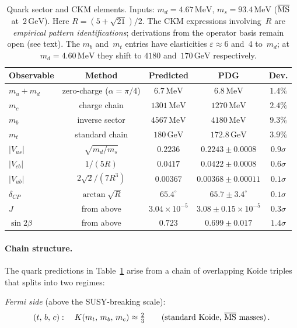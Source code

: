 \documentclass[12pt,a4paper]{article}
\newcommand{\MeV}{\,\mathrm{MeV}}
\newcommand{\GeV}{\,\mathrm{GeV}}
\begin{document}
\begin{table}[ht]
\centering
\begin{tabular}{lcccc}
\toprule
  Observable & Method & Predicted & PDG & Dev. \\
\midrule
$m_u + m_d$ & zero-charge ($\alpha{=}\pi/4$) & $6.7\MeV$ & $6.8\MeV$ & $1.4\%$ \\
$m_c$ & charge chain & $1301\MeV$ & $1270\MeV$ & $2.4\%$ \\
$m_b$ & inverse sector & $4567\MeV$ & $4180\MeV$ & $9.3\%$ \\
$m_t$ & standard chain & $180\GeV$ & $172.8\GeV$ & $3.9\%$ \\
$|V_{us}|$ & $\sqrt{m_d/m_s}$ & $0.2236$ & $0.2243 \pm 0.0008$ & $0.9\sigma$ \\
$|V_{cb}|$ & $1/(5R)$ & $0.0417$ & $0.0422 \pm 0.0008$ & $0.6\sigma$ \\
$|V_{ub}|$ & $2\sqrt{2}/(7R^3)$ & $0.00367$ & $0.00368 \pm 0.00011$ & $0.1\sigma$ \\
$\delta_{CP}$ & $\arctan\sqrt{R}$ & $65.4^\circ$ & $65.7 \pm 3.4^\circ$ & $0.1\sigma$ \\
$J$ & from above & $3.04{\times}10^{-5}$ & $3.08 \pm 0.15{\times}10^{-5}$ & $0.3\sigma$ \\
$\sin 2\beta$ & from above & $0.723$ & $0.699 \pm 0.017$ & $1.4\sigma$ \\
\bottomrule
\end{tabular}
\caption{Quark sector and CKM elements.
Inputs: $m_d = 4.67\MeV$, $m_s = 93.4\MeV$
($\overline{\rm MS}$ at~$2\GeV$). Here $R = (5+\sqrt{21})/2$.
The CKM expressions involving~$R$ are \emph{empirical pattern
identifications}; derivations from the operator basis remain open
(see text). The $m_b$ and~$m_t$ entries have elasticities
$\varepsilon \approx 6$ and~4 to~$m_d$; at $m_d = 4.60\MeV$ they
shift to $4180$ and~$170\GeV$ respectively.}
\label{tab:quarks}
\end{table}

\paragraph{Chain structure.}
The quark predictions in Table~\ref{tab:quarks} arise from a chain of
overlapping Koide triples~\cite{Rivero:2024epjc} that splits into two
regimes:

\noindent
\emph{Fermi side} (above the SUSY-breaking scale):
\begin{equation}
  (t,\,b,\,c):\quad K(m_t,\,m_b,\,m_c) \approx \tfrac{2}{3}
  \qquad\text{(standard Koide, $\overline{\rm MS}$ masses)}\,.
  \label{eq:chain_tbc}
\end{equation}
\end{document}
